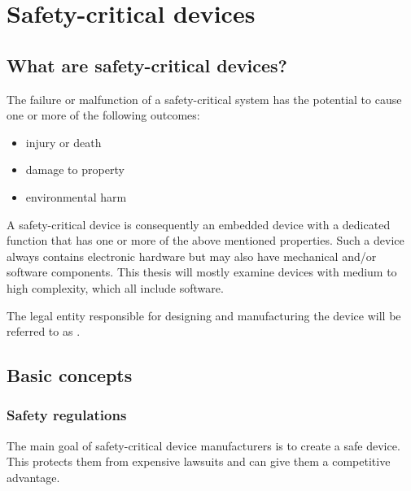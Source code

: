 \section{Safety-critical devices}
\subsection{What are safety-critical devices?}
The failure or malfunction of a safety-critical system has the potential to cause one or more of the following outcomes:
\begin{itemize}
\item injury or death
\item damage to property
\item environmental harm
\end{itemize}
A safety-critical device is consequently an embedded device with a dedicated function that has one or more of the above mentioned properties. Such a device always contains electronic hardware but may also have mechanical and/or software components. This thesis will mostly examine devices with medium to high complexity, which all include software.

The legal entity responsible for designing and manufacturing the device will be referred to as \mfg{}.
\subsection{Basic concepts}
\subsubsection{Safety regulations}
The main goal of safety-critical device manufacturers is to create a safe device. This protects them from expensive lawsuits and can give them a competitive advantage.

